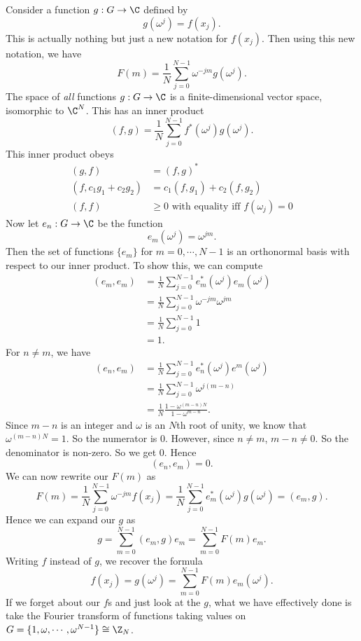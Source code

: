 \documentclass[a4paper]{article}
\begin{document}
Consider a function $g: G \to \C$ defined by
\[
  g(\omega^j) = f(x_j).
\]
This is actually nothing but just a new notation for $f(x_j)$. Then using this new notation, we have
\[
  F(m) = \frac{1}{N} \sum_{j = 0}^{N - 1} \omega^{-jm} g(\omega^j).
\]
The space of \emph{all} functions $g: G \to \C$ is a finite-dimensional vector space, isomorphic to $\C^N$. This has an inner product
\[
  (f, g) = \frac{1}{N} \sum_{j = 0}^{N - 1} f^*(\omega^j) g(\omega^j).
\]
This inner product obeys
\begin{align*}
  (g, f) &= (f, g)^*\\
  (f, c_1 g_1 + c_2 g_2) &= c_1 (f, g_1) + c_2 (f, g_2)\\
  (f, f) &\geq 0\text{ with equality iff }f(\omega_j) = 0
\end{align*}
Now let $e_n: G \to \C$ be the function
\[
  e_m(\omega^j) = \omega^{jm}.
\]
Then the set of functions $\{e_m\}$ for $m = 0, \cdots, N - 1$ is an orthonormal basis with respect to our inner product. To show this, we can compute
\begin{align*}
  (e_m, e_m) &= \frac{1}{N} \sum_{j = 0}^{N - 1} e_m^*(\omega^j) e_m(\omega^j)\\
  &= \frac{1}{N} \sum_{j = 0}^{N - 1} \omega^{-jm} \omega^{jm}\\
  &= \frac{1}{N} \sum_{j = 0}^{N - 1} 1\\
  &= 1.
\end{align*}
For $n \not =m$, we have
\begin{align*}
  (e_n, e_m) &= \frac{1}{N} \sum_{j = 0}^{N - 1} e_n^* (\omega^j) e^m(\omega^j)\\
  &= \frac{1}{N} \sum_{j = 0}^{N - 1} \omega^{j(m - n)}\\
  &= \frac{1}{N} \frac{1 - \omega^{(m - n)N}}{1 - \omega^{m - n}}.
\end{align*}
Since $m - n$ is an integer and $\omega$ is an $N$th root of unity, we know that $\omega^{(m - n)N} = 1$. So the numerator is $0$. However, since $n \not= m$, $m - n\not=0$. So the denominator is non-zero. So we get $0$. Hence
\[
  (e_n, e_m) = 0 .
\]
We can now rewrite our $F(m)$ as
\[
  F(m) = \frac{1}{N}\sum_{j = 0}^{N - 1}\omega^{-jm} f(x_j) = \frac{1}{N}\sum_{j = 0}^{N - 1} e_m^* (\omega^j) g(\omega^j) = (e_m, g).
\]
Hence we can expand our $g$ as
\[
  g = \sum_{m = 0}^{N - 1} (e_m, g) e_m = \sum_{m = 0}^{N - 1} F(m) e_m.
\]
Writing $f$ instead of $g$, we recover the formula
\[
  f(x_j) = g(\omega^j) = \sum_{m = 0}^{N - 1} F(m) e_m(\omega^j).
\]
If we forget about our $f$s and just look at the $g$, what we have effectively done is take the Fourier transform of functions taking values on $G = \{1, \omega, \cdots, \omega^{N - 1}\}\cong \Z_N$.
\end{document}

